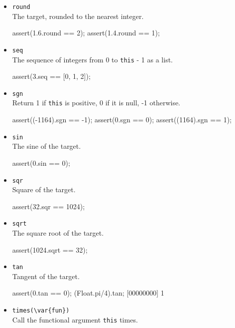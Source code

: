 \begin{itemize}
\item \lstinline|round|\\
  The target, rounded to the nearest integer.
\begin{urbiscript}[firstnumber=last]
assert(1.6.round == 2);
assert(1.4.round == 1);
\end{urbiscript}

\item \lstinline|seq|\\
  The sequence of integers from 0 to \lstinline|this| - 1 as a list.
\begin{urbiscript}[firstnumber=last]
assert(3.seq == [0, 1, 2]);
\end{urbiscript}

\item \lstinline|sgn|\\
  Return 1 if \lstinline|this| is positive, 0 if it is null, -1
  otherwise.
\begin{urbiscript}[firstnumber=last]
assert((-1164).sgn == -1);
assert(0.sgn       == 0);
assert((1164).sgn  == 1);
\end{urbiscript}

\item \lstinline|sin|\\
  The sine of the target.
\begin{urbiscript}[firstnumber=last]
assert(0.sin == 0);
\end{urbiscript}

\item \lstinline|sqr|\\
  Square of the target.
\begin{urbiscript}[firstnumber=last]
assert(32.sqr == 1024);
\end{urbiscript}

\item \lstinline|sqrt|\\
  The square root of the target.
\begin{urbiscript}[firstnumber=last]
assert(1024.sqrt == 32);
\end{urbiscript}

\item \lstinline|tan|\\
  Tangent of the target.
\begin{urbiscript}[firstnumber=last]
assert(0.tan == 0);
(Float.pi/4).tan;
[00000000] 1
\end{urbiscript}

\item \lstinline|times(\var{fun})|\\
  Call the functional argument  \lstinline|this| times.


\end{itemize}
